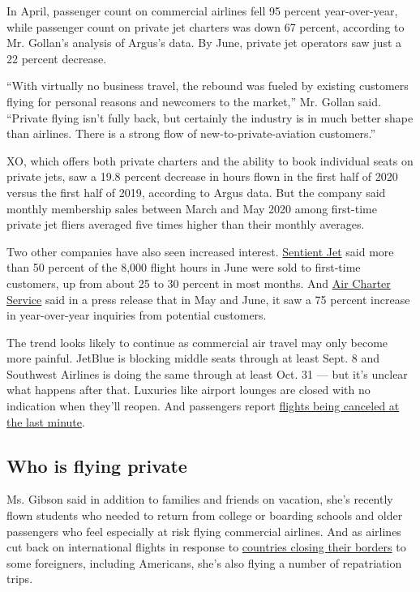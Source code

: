 In April, passenger count on commercial airlines fell 95 percent
year-over-year, while passenger count on private jet charters was down
67 percent, according to Mr. Gollan's analysis of Argus's data. By June,
private jet operators saw just a 22 percent decrease.

``With virtually no business travel, the rebound was fueled by existing
customers flying for personal reasons and newcomers to the market,'' Mr.
Gollan said. ``Private flying isn't fully back, but certainly the
industry is in much better shape than airlines. There is a strong flow
of new-to-private-aviation customers.''

XO, which offers both private charters and the ability to book
individual seats on private jets, saw a 19.8 percent decrease in hours
flown in the first half of 2020 versus the first half of 2019, according
to Argus data. But the company said monthly membership sales between
March and May 2020 among first-time private jet fliers averaged five
times higher than their monthly averages.

Two other companies have also seen increased interest.
\href{https://www.sentient.com/}{Sentient Jet} said more than 50 percent
of the 8,000 flight hours in June were sold to first-time customers, up
from about 25 to 30 percent in most months. And
\href{https://www.aircharterserviceusa.com/}{Air Charter Service} said
in a press release that in May and June, it saw a 75 percent increase in
year-over-year inquiries from potential customers.

The trend looks likely to continue as commercial air travel may only
become more painful. JetBlue is blocking middle seats through at least
Sept. 8 and Southwest Airlines is doing the same through at least Oct.
31 --- but it's unclear what happens after that. Luxuries like airport
lounges are closed with no indication when they'll reopen. And
passengers report
\href{https://www.nytimes.com/2020/06/18/travel/travel-refunds-airlines.html}{flights
being canceled at the last minute}.

\hypertarget{who-is-flying-private}{%
\subsection{Who is flying private}\label{who-is-flying-private}}

Ms. Gibson said in addition to families and friends on vacation, she's
recently flown students who needed to return from college or boarding
schools and older passengers who feel especially at risk flying
commercial airlines. And as airlines cut back on international flights
in response to
\href{https://www.nytimes.com/article/coronavirus-travel-restrictions.html}{countries
closing their borders} to some foreigners, including Americans, she's
also flying a number of repatriation trips.

